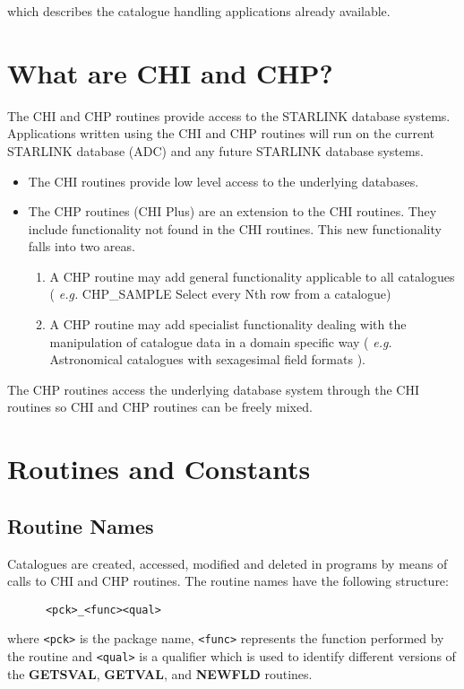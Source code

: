 which describes the catalogue handling applications already available.

\section {What are CHI and CHP?}

The CHI and CHP routines provide access to the STARLINK database systems.
Applications written using the CHI and CHP routines will
run on the current STARLINK database (ADC) and any future STARLINK database
systems.
\begin{itemize}
   \item The CHI routines provide low level access to the underlying databases.
   \item The CHP routines (CHI Plus) are an extension to the CHI routines. 
They include
functionality not found in the CHI routines.
This new functionality falls into two areas. 
\begin{enumerate}
  \item A CHP routine may add general functionality applicable 
to all catalogues ( {\em e.g.} CHP\_SAMPLE Select every Nth row from a catalogue)
  \item A CHP routine may add specialist functionality dealing with the 
manipulation of catalogue data in a domain specific way 
( {\em e.g.} Astronomical catalogues with sexagesimal 
field formats ).
\end{enumerate}
\end{itemize}
The CHP routines access the underlying database system through the CHI routines
so CHI and CHP routines can be freely mixed.

\section{Routines and Constants}

\subsection{Routine Names}

Catalogues are created, accessed, modified and deleted in programs by means of
calls to CHI and CHP routines. The routine names have the following structure: 

\begin{verbatim}
      <pck>_<func><qual>
\end{verbatim}

where \verb+<pck>+ is the package name, \verb+<func>+ represents the
function performed by the routine and \verb+<qual>+ is a qualifier which is
used to identify different versions of the {\bf GETSVAL}, {\bf GETVAL}, 
and {\bf NEWFLD} routines. 


